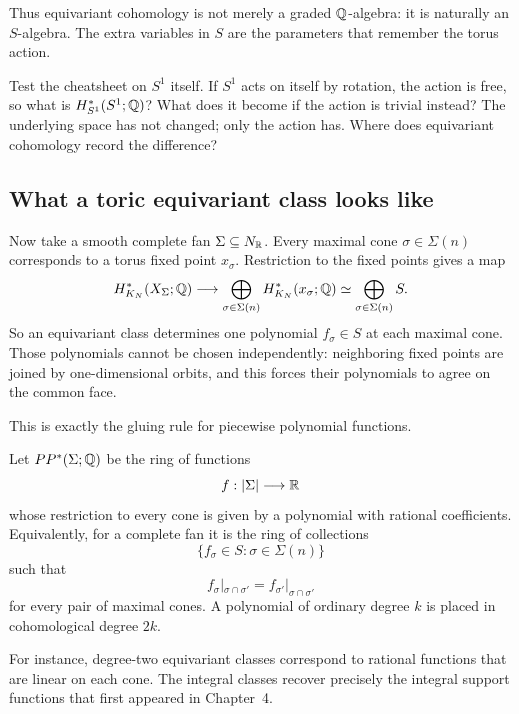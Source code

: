 Thus equivariant cohomology is not merely a graded \(\mathbb{Q}\)-algebra: it
is naturally an \(S\)-algebra. The extra variables in \(S\) are the
parameters that remember the torus action.

\begin{pauseandthink}
Test the cheatsheet on \(S^1\) itself.  If \(S^1\) acts on itself by
rotation, the action is free, so what is \(H_{S^1}^*(S^1;\mathbb{Q})\)?  What
does it become if the action is trivial instead?  The underlying space
has not changed; only the action has.  Where does equivariant
cohomology record the difference?
\end{pauseandthink}

\subsection{What a toric equivariant class looks like}

Now take a smooth complete fan \(\Sigma\subseteq N_{\mathbb{R}}\). Every maximal
cone \(\sigma\in\Sigma(n)\) corresponds to a torus fixed point
\(x_\sigma\). Restriction to the fixed points gives a map
\[
H_{K_N}^*(X_\Sigma;\mathbb{Q})
\longrightarrow
\bigoplus_{\sigma\in\Sigma(n)}
H_{K_N}^*(x_\sigma;\mathbb{Q})
\simeq
\bigoplus_{\sigma\in\Sigma(n)}S.
\]
So an equivariant class determines one polynomial \(f_\sigma\in S\)
at each maximal cone. Those polynomials cannot be chosen
independently: neighboring fixed points are joined by one-dimensional
orbits, and this forces their polynomials to agree on the common face.

This is exactly the gluing rule for piecewise polynomial functions.

\begin{definition}
\label{def:piecewise-polynomial-fan}
Let \(PP^*(\Sigma;\mathbb{Q})\) be the ring of functions
\[
f:|\Sigma|\longrightarrow\mathbb{R}
\]
whose restriction to every cone is given by a polynomial with rational
coefficients. Equivalently, for a complete fan it is the ring of collections
\[
\{f_\sigma\in S:\sigma\in\Sigma(n)\}
\]
such that
\[
f_\sigma|_{\sigma\cap\sigma'}
=
f_{\sigma'}|_{\sigma\cap\sigma'}
\]
for every pair of maximal cones. A polynomial of ordinary degree \(k\)
is placed in cohomological degree \(2k\).
\end{definition}

For instance, degree-two equivariant classes correspond to rational
functions that are linear on each cone. The integral classes recover
precisely the integral support functions that first appeared in
Chapter~4.

